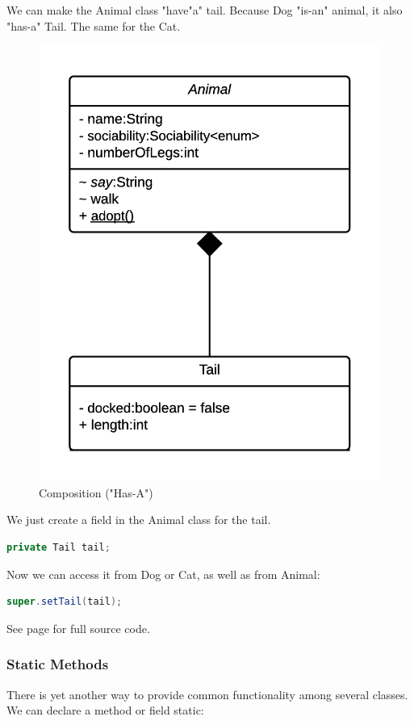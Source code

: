 We can make the Animal class "have"a" tail. Because Dog "is-an" animal, it also "has-a" Tail. The same for the Cat.
\begin{figure}[H]\centering %
\includegraphics[width=0.9\linewidth]{images/composition}
\caption{Composition ("Has-A")}
\label{fig:composition}
\end{figure}

We just create a field in the Animal class for the tail.
\begin{lstlisting}[language=Java]
private Tail tail;
\end{lstlisting}

Now we can access it from Dog or Cat, as well as from Animal:
\begin{lstlisting}[language=Java]
super.setTail(tail);
\end{lstlisting}

See page \pageref{App:AppendixJComposition} for full source code.

\subsubsection{Static Methods}
There is yet another way to provide common functionality among several classes. We can declare a method or field static:

